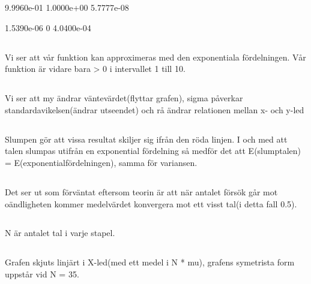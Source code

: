 \documentclass{article}
\begin{document}
   9.9960e-01
   1.0000e+00
   5.7777e-08

   1.5390e-06
            0
   4.0400e-04
\subsection{}
Vi ser att vår funktion kan approximeras med den exponentiala fördelningen. Vår funktion är vidare bara > 0 i intervallet 1 till 10.
\subsection{}
Vi ser att my ändrar väntevärdet(flyttar grafen), sigma påverkar
standardavikelsen(ändrar utseendet) och rå ändrar relationen mellan x- och
y-led
\subsection{}
Slumpen gör att vissa resultat skiljer sig ifrån den röda linjen. I och med att talen slumpas utifrån en exponential fördelning så medför det att E(slumptalen) = E(exponentialfördelningen), samma för variansen.

\subsection{}
Det ser ut som förväntat eftersom teorin är att när antalet försök går mot oändligheten kommer medelvärdet konvergera mot ett visst tal(i detta fall 0.5).
\subsection{}
N är antalet tal i varje stapel.
\subsection{}
Grafen skjuts linjärt i X-led(med ett medel i N * mu), grafens symetrista form uppstår vid N = 35.
\subsection{}
\end{document}
